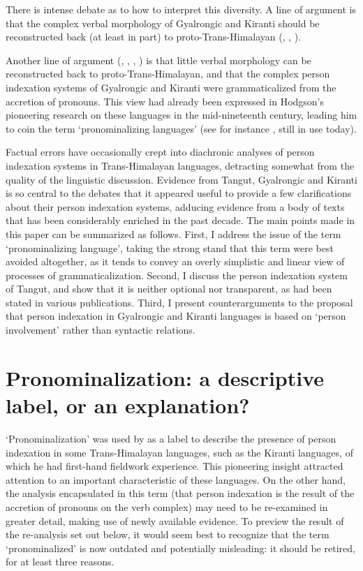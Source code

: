 \documentclass[oldfontcommands,oneside,a4paper,11pt]{article}
\begin{document}
There is intense debate as to how to interpret this diversity. A line of argument is that the complex verbal morphology of Gyalrongic and Kiranti should be reconstructed back (at least in part) to proto-Trans-Himalayan (\citealt{bauman75}, \citealt{delancey89agreement, delancey10agreement, driem93agreement}, \citealt{jacques12agreement}). 
 

Another line of argument (\citealt{lapolla92},  \citealt{lapolla03}, \citealt{lapolla12comments}, \citealt{zeisler15eat}) is that little verbal morphology can be reconstructed back to proto-Trans-Himalayan, and that the complex person indexation systems of Gyalrongic and Kiranti were grammaticalized from the accretion of pronouns. This view had already been expressed in Hodgson's pioneering research on these languages in the mid-nineteenth century, leading him to coin the term `pronominalizing languages' (see for instance  \citealt{hodgson57sifan}, still in use today).

Factual errors have occasionally crept into diachronic analyses of person indexation systems in Trans-Himalayan languages, detracting somewhat from the quality of the linguistic discussion. Evidence from Tangut, Gyalrongic and Kiranti is so central to the debates that it appeared useful to provide a few clarifications about their person indexation systems, adducing evidence from a body of texts that has been considerably enriched in the past decade. The main points made in this paper can be summarized as follows. First, I address the issue of the term `pronominalizing language', taking the strong stand that this term were best avoided altogether, as it tends to convey an overly simplistic and linear view of processes of grammaticalization. Second, I discuss the person indexation system of Tangut, and show that it is neither optional nor transparent, as had been stated in various publications. Third, I present counterarguments to the proposal that person indexation in Gyalrongic and Kiranti languages is based on `person involvement' rather than syntactic relations. 

\section{Pronominalization: a descriptive label, or an explanation?}
`Pronominalization' was used by \citet{hodgson57sifan} as a label to describe the presence of person indexation in some Trans-Himalayan languages, such as the Kiranti languages, of which he had first-hand fieldwork experience. This pioneering insight attracted attention to an important characteristic of these languages. On the other hand, the analysis encapsulated in this term (that person indexation is the result of the accretion of pronouns on the verb complex) may need to be re-examined in greater detail, making use of newly available evidence. To preview the result of the re-analysis set out below, it would seem best to recognize that the term `pronominalized' is now outdated and potentially misleading: it should be retired, for at least three reasons.
\end{document}

